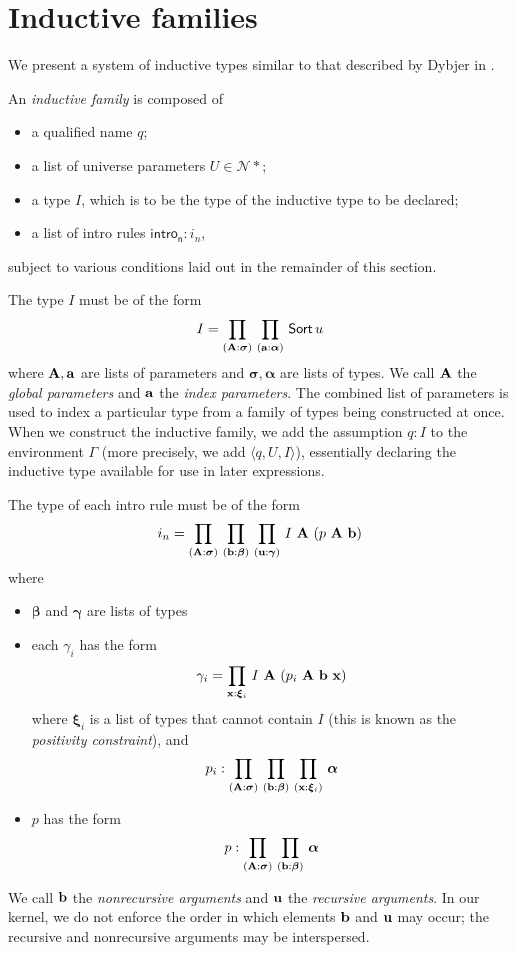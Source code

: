 \section{Inductive families}
We present a system of inductive types similar to that described by Dybjer in \cite{Dybjer1994}.
\begin{defn}
	An \textit{inductive family} is composed of
	\begin{itemize}
		\item a qualified name \( q \);
		\item a list of universe parameters \( U \in \mathcal N \ast \);
		\item a type \( I \), which is to be the type of the inductive type to be declared;
		\item a list of intro rules \( \mathsf{intro_n} : i_n \),
	\end{itemize}
	subject to various conditions laid out in the remainder of this section.
\end{defn}
The type \( I \) must be of the form
\[ I = \prd{\vb A : \bm \sigma}{\vb a : \bm \alpha} \Sort u \]
where \( \vb A, \vb a \) are lists of parameters and \( \bm \sigma, \bm \alpha \) are lists of types.
We call \( \vb A \) the \textit{global parameters} and \( \vb a \) the \textit{index parameters}.
The combined list of parameters is used to index a particular type from a family of types being constructed at once.
When we construct the inductive family, we add the assumption \( q : I \) to the environment \( \Gamma \) (more precisely, we add \( \langle q, U, I \rangle \)), essentially declaring the inductive type available for use in later expressions.

The type of each intro rule must be of the form
\[ i_n = \prd{\vb A : \bm \sigma}{\vb b : \bm \beta}{\vb u : \bm \gamma} I\ \vb A\ (p\ \vb A\ \vb b) \]
where
\begin{itemize}
	\item \( \bm \beta \) and \( \bm \gamma \) are lists of types
	\item each \( \gamma_i \) has the form
	\[ \gamma_i = \prd{\vb x:\bm \xi_i} I\ \vb A\ (p_i\ \vb A\ \vb b\ \vb x) \]
	where \( \bm \xi_i \) is a list of types that cannot contain \( I \) (this is known as the \textit{positivity constraint}), and
	\[ p_i : \prd{\vb A : \bm \sigma}{\vb b : \bm \beta}{\vb x:\bm \xi_i} \bm \alpha \]
	\item \( p \) has the form
	\[ p : \prd{\vb A : \bm \sigma}{\vb b : \bm \beta} \bm \alpha \]
\end{itemize}
We call \( \vb b \) the \textit{nonrecursive arguments} and \( \vb u \) the \textit{recursive arguments}.
In our kernel, we do not enforce the order in which elements \( \vb b \) and \( \vb u \) may occur; the recursive and nonrecursive arguments may be interspersed.

